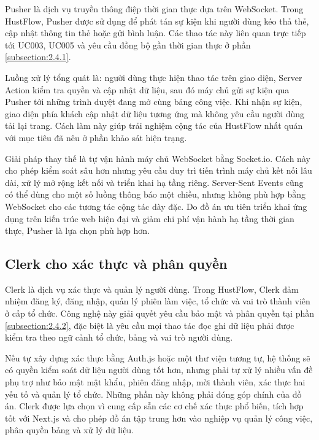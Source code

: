 \documentclass[../DoAn.tex]{subfiles}
\begin{document}
Pusher \cite{pusher} là dịch vụ truyền thông điệp thời gian thực dựa trên WebSocket. Trong HustFlow, Pusher được sử dụng để phát tán sự kiện khi người dùng kéo thả thẻ, cập nhật thông tin thẻ hoặc gửi bình luận. Các thao tác này liên quan trực tiếp tới UC003, UC005 và yêu cầu đồng bộ gần thời gian thực ở phần \ref{subsection:2.4.1}.

Luồng xử lý tổng quát là: người dùng thực hiện thao tác trên giao diện, Server Action kiểm tra quyền và cập nhật dữ liệu, sau đó máy chủ gửi sự kiện qua Pusher tới những trình duyệt đang mở cùng bảng công việc. Khi nhận sự kiện, giao diện phía khách cập nhật dữ liệu tương ứng mà không yêu cầu người dùng tải lại trang. Cách làm này giúp trải nghiệm cộng tác của HustFlow nhất quán với mục tiêu đã nêu ở phần khảo sát hiện trạng.

Giải pháp thay thế là tự vận hành máy chủ WebSocket bằng Socket.io. Cách này cho phép kiểm soát sâu hơn nhưng yêu cầu duy trì tiến trình máy chủ kết nối lâu dài, xử lý mở rộng kết nối và triển khai hạ tầng riêng. Server-Sent Events cũng có thể dùng cho một số luồng thông báo một chiều, nhưng không phù hợp bằng WebSocket cho các tương tác cộng tác dày đặc. Do đồ án ưu tiên triển khai ứng dụng trên kiến trúc web hiện đại và giảm chi phí vận hành hạ tầng thời gian thực, Pusher là lựa chọn phù hợp hơn.

\subsection{Clerk cho xác thực và phân quyền}
\label{subsection:3.2.4}

Clerk \cite{clerk} là dịch vụ xác thực và quản lý người dùng. Trong HustFlow, Clerk đảm nhiệm đăng ký, đăng nhập, quản lý phiên làm việc, tổ chức và vai trò thành viên ở cấp tổ chức. Công nghệ này giải quyết yêu cầu bảo mật và phân quyền tại phần \ref{subsection:2.4.2}, đặc biệt là yêu cầu mọi thao tác đọc ghi dữ liệu phải được kiểm tra theo ngữ cảnh tổ chức, bảng và vai trò người dùng.

Nếu tự xây dựng xác thực bằng Auth.js hoặc một thư viện tương tự, hệ thống sẽ có quyền kiểm soát dữ liệu người dùng tốt hơn, nhưng phải tự xử lý nhiều vấn đề phụ trợ như bảo mật mật khẩu, phiên đăng nhập, mời thành viên, xác thực hai yếu tố và quản lý tổ chức. Những phần này không phải đóng góp chính của đồ án. Clerk được lựa chọn vì cung cấp sẵn các cơ chế xác thực phổ biến, tích hợp tốt với Next.js và cho phép đồ án tập trung hơn vào nghiệp vụ quản lý công việc, phân quyền bảng và xử lý dữ liệu.
\end{document}

